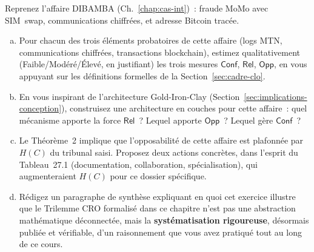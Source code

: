 \begin{boxexo}[title={\ding{45}\quad Exercice~27.3. Application intégrative à une affaire du cours \niveauexpert}]
Reprenez l'affaire DIBAMBA (Ch.~\ref{chap:cas-int})~: fraude MoMo
avec SIM~swap, communications chiffrées, et adresse Bitcoin tracée.
\begin{enumerate}[(a)]
    \item Pour chacun des trois éléments probatoires de cette
          affaire (logs MTN, communications chiffrées, transactions
          blockchain), estimez qualitativement (Faible/Modéré/Élevé,
          en justifiant) les trois mesures $\mathsf{Conf}$,
          $\mathsf{Rel}$, $\mathsf{Opp}$, en vous appuyant sur les
          définitions formelles de la Section~\ref{sec:cadre-clo}.
    \item En vous inspirant de l'architecture Gold-Iron-Clay
          (Section~\ref{sec:implications-conception}), construisez
          une architecture en couches pour cette affaire~: quel
          mécanisme apporte la force $\mathsf{Rel}$~? Lequel apporte
          $\mathsf{Opp}$~? Lequel gère $\mathsf{Conf}$~?
    \item Le Théorème~2 implique que l'opposabilité de cette
          affaire est plafonnée par $H(C)$ du tribunal saisi.
          Proposez deux actions concrètes, dans l'esprit du
          Tableau~27.1 (documentation, collaboration, spécialisation),
          qui augmenteraient $H(C)$ pour ce dossier spécifique.
    \item Rédigez un paragraphe de synthèse expliquant en quoi
          cet exercice illustre que le Trilemme CRO formalisé
          dans ce chapitre n'est pas une abstraction mathématique
          déconnectée, mais la \textbf{systématisation rigoureuse},
          désormais publiée et vérifiable, d'un raisonnement que
          vous avez pratiqué tout au long de ce cours.
\end{enumerate}
\end{boxexo}

\bigskip

